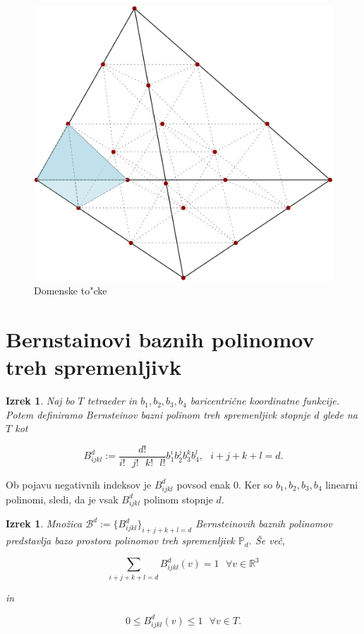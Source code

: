 \documentclass[12pt,a4paper]{amsart}
\theoremstyle{definition} %
\theoremstyle{plain} %
\newtheorem{izrek}[definicija]{Izrek}
\begin{document}
\begin{figure}[h!]
\centering
  \includegraphics[scale=0.4]{domen}
  \caption{Domenske to"cke}
  \label{fig:domenske}
\end{figure}

\section{Bernstainovi baznih polinomov treh spremenljivk}

\begin{izrek}
  Naj bo $T$ tetraeder in $b_1,b_2,b_3,b_4$
  baricentrične koordinatne funkcije.
  Potem definiramo Bernsteinov bazni polinom treh spremenljivk 
  stopnje $d$ glede na $T$ kot 

  $$
  B_{ijkl}^d := \frac{d!}{i!\text{ }j!\text{ }k!\text{ }l!}b_1^ib_2^jb_3^kb_4^l,\text{    }i+j+k+l=d.
  $$
\end{izrek}

Ob pojavu negativnih indeksov je $B_{ijkl}^d$ povsod enak 0.
Ker so $b_1,b_2,b_3,b_4$ linearni polinomi, sledi,
da je vsak $B_{ijkl}^d$ polinom stopnje $d$. 

\begin{izrek}
  Množica $\mathcal{B}^d := \{B_{ijkl}^d\}_{i+j+k+l=d}$
  Bernsteinovih baznih polinomov predstavlja bazo 
  prostora polinomov treh spremenljivk $\mathbb{P}_d$.
  Še več,

  $$
  \sum_{i+j+k+l=d}B^d_{ijkl}(v)=1\text{ }\forall v\in\mathbb{R}^3
  $$
  
  in

  $$
  0\leq B_{ijkl}^d(v)\leq 1\text{ }\forall v\in T.
  $$
\end{izrek}
\end{document}
